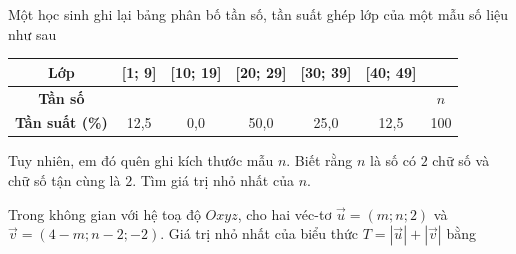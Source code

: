 \begin{ex}%
Một học sinh ghi lại bảng phân bố tần số, tần suất ghép lớp của một mẫu số liệu như sau
\begin{center}
	\begin{tabular}{|c|c|c|c|c|c|c|}
		\hline
		\bf Lớp  & [1; 9] & [10; 19] & [20; 29] & [30; 39] & [40; 49] & \\
		\hline
		\bf Tần số & & & & & & $n$\\
		\hline
		\bf Tần suất (\%) & 12{,}5 & 0{,}0 & 50{,}0 & 25{,}0 & 12{,}5 & 100\\
		\hline
	\end{tabular}
\end{center}
Tuy nhiên, em đó quên ghi kích thước mẫu $n$. Biết rằng $n$ là số có $2$ chữ số và chữ số tận cùng là $2$. Tìm giá trị nhỏ nhất của $n$.
\end{ex}

\begin{ex}%
Trong không gian với hệ toạ độ $Oxyz$, cho hai véc-tơ $\overrightarrow{u} = (m;n;2)$ và\break$\overrightarrow{v} = (4-m;n-2;-2)$. Giá trị nhỏ nhất của biểu thức $T=|\overrightarrow{u}| + |\overrightarrow{v}|$ bằng
\end{ex}

